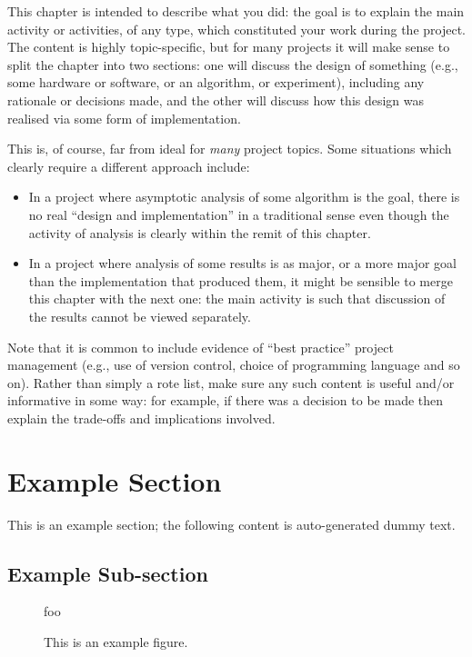 \documentclass[ %
                    author={Dominic Joseph Moylett},
                supervisor={Dr. Raphael Clifford and Dr. Benjamin Sach},
                    degree={MEng},
                     title={Dictionary Matching with Fingerprints},
                  subtitle={An Empirical Analysis},
                      type={Research},
                      year={2014} ]{dissertation}
\begin{document}
\noindent
This chapter is intended to describe what you did: the goal is to explain
the main activity or activities, of any type, which constituted your work 
during the project.  The content is highly topic-specific, but for many 
projects it will make sense to split the chapter into two sections: one 
will discuss the design of something (e.g., some hardware or software, or 
an algorithm, or experiment), including any rationale or decisions made, 
and the other will discuss how this design was realised via some form of 
implementation.  

This is, of course, far from ideal for {\em many} project topics.  Some
situations which clearly require a different approach include:

\begin{itemize}
\item In a project where asymptotic analysis of some algorithm is the goal,
      there is no real ``design and implementation'' in a traditional sense
      even though the activity of analysis is clearly within the remit of
      this chapter.
\item In a project where analysis of some results is as major, or a more
      major goal than the implementation that produced them, it might be
      sensible to merge this chapter with the next one: the main activity 
      is such that discussion of the results cannot be viewed separately.
\end{itemize}

\noindent
Note that it is common to include evidence of ``best practice'' project 
management (e.g., use of version control, choice of programming language 
and so on).  Rather than simply a rote list, make sure any such content 
is useful and/or informative in some way: for example, if there was a 
decision to be made then explain the trade-offs and implications 
involved.

\section{Example Section}

This is an example section; 
the following content is auto-generated dummy text.
\lipsum

\subsection{Example Sub-section}

\begin{figure}[t]
\centering
foo
\caption{This is an example figure.}
\label{fig}
\end{figure}
\end{document}
